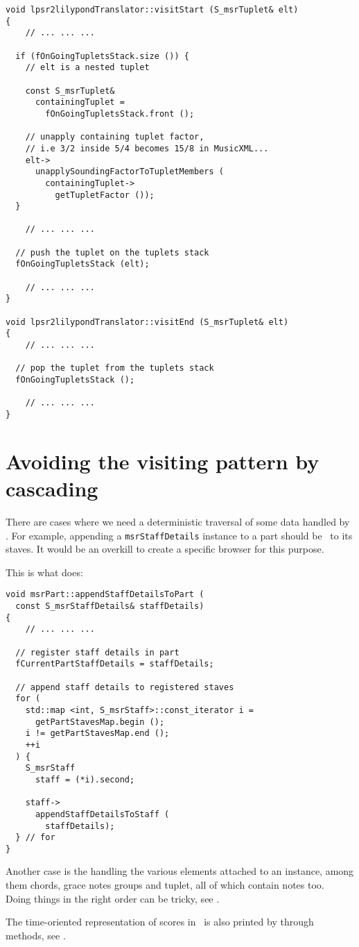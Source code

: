 \begin{lstlisting}[language=CPlusPlus]
void lpsr2lilypondTranslator::visitStart (S_msrTuplet& elt)
{
	// ... ... ...

  if (fOnGoingTupletsStack.size ()) {
    // elt is a nested tuplet

    const S_msrTuplet&
      containingTuplet =
        fOnGoingTupletsStack.front ();

    // unapply containing tuplet factor,
    // i.e 3/2 inside 5/4 becomes 15/8 in MusicXML...
    elt->
      unapplySoundingFactorToTupletMembers (
        containingTuplet->
          getTupletFactor ());
  }

	// ... ... ...

  // push the tuplet on the tuplets stack
  fOnGoingTupletsStack (elt);

	// ... ... ...
}

void lpsr2lilypondTranslator::visitEnd (S_msrTuplet& elt)
{
	// ... ... ...

  // pop the tuplet from the tuplets stack
  fOnGoingTupletsStack ();

	// ... ... ...
}
\end{lstlisting}


\section{Avoiding the visiting pattern by cascading}

There are cases where we need a deterministic traversal of some data handled by \mf. For example, appending a {\tt msrStaffDetails} instance to a part should be \cascaded\ to its staves. It would be an overkill to create a specific browser for this purpose.

This is what  does:
\begin{lstlisting}[language=CPlusPlus]
void msrPart::appendStaffDetailsToPart (
  const S_msrStaffDetails& staffDetails)
{
	// ... ... ...

  // register staff details in part
  fCurrentPartStaffDetails = staffDetails;

  // append staff details to registered staves
  for (
    std::map <int, S_msrStaff>::const_iterator i =
      getPartStavesMap.begin ();
    i != getPartStavesMap.end ();
    ++i
  ) {
    S_msrStaff
      staff = (*i).second;

    staff->
      appendStaffDetailsToStaff (
        staffDetails);
  } // for
}
\end{lstlisting}

Another case is the handling the various elements attached to an  instance, among them chords, grace notes groups and tuplet, all of which contain notes too. \\
Doing things in the right order can be tricky, see .

The time-oriented representation of scores in \msrRepr\ is also printed by \cascading through  methods, see .
